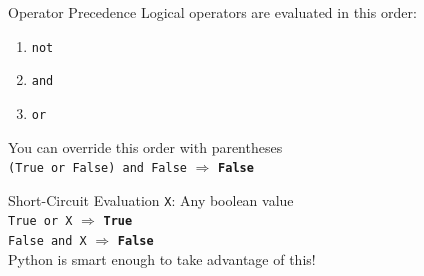         \begin{frame}{Operator Precedence}
            \LARGE
            Logical operators are evaluated in this order:
            \begin{enumerate}
                \item \texttt{not}
                \item \texttt{and}
                \item \texttt{or}
            \end{enumerate}
            You can override this order with parentheses\\
            \pause
            \texttt{(True or False) and False} $\Rightarrow$ 
            \pause
            \textbf{\texttt{False}} \\
        \end{frame}

        \begin{frame}{Short-Circuit Evaluation}
            \LARGE
            \texttt{X}: Any boolean value\\
            \texttt{True or X} $\Rightarrow$ 
            \pause
            \textbf{\texttt{True}}\\
            \pause
            \texttt{False and X} $\Rightarrow$ 
            \pause
            \textbf{\texttt{False}}\\
            \pause
            Python is smart enough to take advantage of this!
            \pause
            \inputminted[frame=single,framesep=2pt]{python3}{code-examples/short_circuit.py}
        \end{frame}

